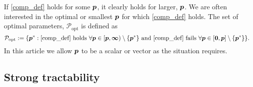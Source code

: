 \documentclass[11pt,a4paper]{article}
\begin{document}
If \eqref{comp_def} holds for some $\boldsymbol{p}$, it clearly holds for larger, $\boldsymbol{p}$.  We are often interested in the optimal or smallest $\boldsymbol{p}$ for which \eqref{comp_def} holds.
The  set of optimal parameters, $\mathcal{P}_{\text{opt}}$ is defined as
\begin{equation}
	\mathcal{P}_{\text{opt}} : = \{\boldsymbol{p}^* : \eqref{comp_def} \text{ holds }\forall \boldsymbol{p} \in [\boldsymbol{p},\boldsymbol{\infty}) \setminus \{\boldsymbol{p}^*\} \text{ and }
	\eqref{comp_def} \text{ fails } \forall \boldsymbol{p} \in [\boldsymbol{0},\boldsymbol{p}] \setminus \{\boldsymbol{p}^*\} \}.
\end{equation}
In this article we allow $\boldsymbol{p}$ to be a scalar or vector as the situation requires.

\subsection{Strong tractability}
\end{document}
